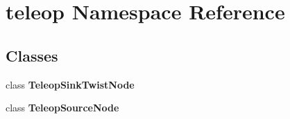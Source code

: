 \section{teleop Namespace Reference}
\label{namespaceteleop}
\subsection*{Classes}
\begin{DoxyCompactItemize}
\item 
class {\bf TeleopSinkTwistNode}
\item 
class {\bf TeleopSourceNode}
\end{DoxyCompactItemize}
